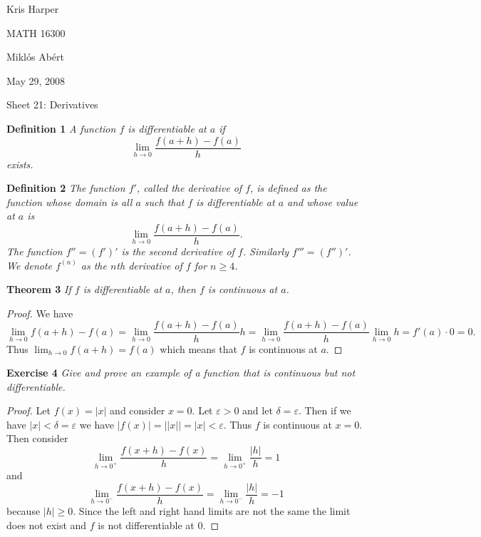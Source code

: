 \documentclass{article}
\begin{document}
\begin{flushright}
Kris Harper

MATH 16300

Mikl\'{o}s Ab\'{e}rt

May 29, 2008
\end{flushright}

\begin{flushleft}

\Large

Sheet 21: Derivatives\newline

\normalsize

\textbf{Definition 1}
\textsl{A function $f$ is differentiable at $a$ if
\[
\lim_{h \rightarrow 0} \frac{f(a+h) - f(a)}{h}
\]
exists.}\newline

\textbf{Definition 2}
\textsl{The function $f'$, called the derivative of $f$, is defined as the function whose domain is all $a$ such that $f$ is differentiable at $a$ and whose value at $a$ is
\[
\lim_{h \rightarrow 0} \frac{f(a+h) - f(a)}{h}.
\]
The function $f'' = (f')'$ is the second derivative of $f$. Similarly $f''' = (f'')'$. We denote $f^{(n)}$ as the $n$th derivative of $f$ for $n \geq 4$.}\newline

\textbf{Theorem 3}
\textsl{If $f$ is differentiable at $a$, then $f$ is continuous at $a$.}
\begin{proof}
We have
\[
\lim_{h \rightarrow 0} f(a+h) - f(a) = \lim_{h \rightarrow 0} \frac{f(a+h) - f(a)}{h} h = \lim_{h \rightarrow 0} \frac{f(a+h) - f(a)}{h} \lim_{h \rightarrow 0} h = f'(a) \cdot 0 = 0.
\]
Thus $\lim_{h \rightarrow 0} f(a + h) = f(a)$ which means that $f$ is continuous at $a$.
\end{proof}

\textbf{Exercise 4}
\textsl{Give and prove an example of a function that is continuous but not differentiable.}
\begin{proof}
Let $f(x) = |x|$ and consider $x = 0$. Let $\varepsilon > 0$ and let $\delta = \varepsilon$. Then if we have $|x| < \delta = \varepsilon$ we have $|f(x)| = ||x|| = |x| < \varepsilon$. Thus $f$ is continuous at $x = 0$. Then consider
\[
\lim_{h \rightarrow 0^+} \frac{f(x+h) - f(x)}{h} = \lim_{h \rightarrow 0^+} \frac{|h|}{h} = 1
\]
and
\[
\lim_{h \rightarrow 0^-} \frac{f(x+h) - f(x)}{h} = \lim_{h \rightarrow 0^-} \frac{|h|}{h} = -1
\]
because $|h| \geq 0$. Since the left and right hand limits are not the same the limit does not exist and $f$ is not differentiable at $0$.
\end{proof}


\end{flushleft}
\end{document}
